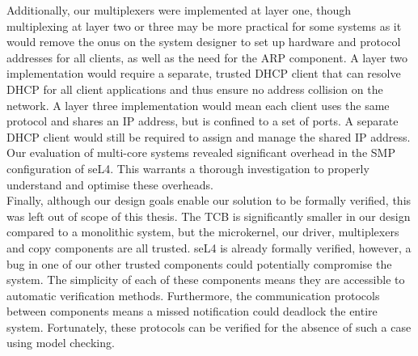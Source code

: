 Additionally, our multiplexers were implemented at layer one, though multiplexing at layer two or three may be more practical for some
systems as it would remove the onus on the system designer to set up hardware and protocol addresses for all clients, as well as the 
need for the ARP component. A layer two implementation would require a separate, trusted DHCP client that can resolve DHCP for all
client applications and thus ensure no address collision on the network. A layer three implementation would mean each client uses the 
same protocol and shares an IP address, but is confined to a set of ports. A separate DHCP client would still be required to assign
and manage the shared IP address. \\

Our evaluation of multi-core systems revealed significant overhead in the SMP configuration of seL4. This warrants a thorough investigation
to properly understand and optimise these overheads. \\

Finally, although our design goals enable our solution to be formally verified, this was left out of scope of this thesis.
The TCB is significantly smaller in our design compared to a monolithic system, but the microkernel, our driver, multiplexers 
and copy components are all trusted. seL4 is already formally verified, however, a bug in one of our other trusted components 
could potentially compromise the system. The simplicity of each of these components means they are accessible to automatic
verification methods. Furthermore, the communication protocols between components means a missed notification could deadlock
the entire system. Fortunately, these protocols can be verified for the absence of such a case using model checking. \\
